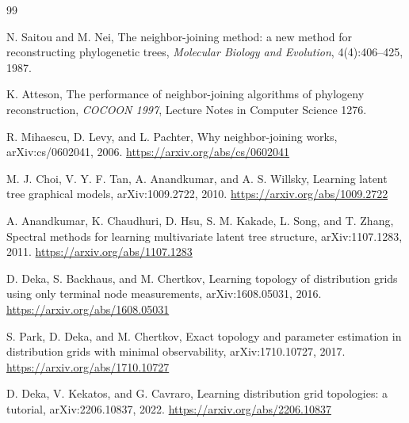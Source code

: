 \documentclass[UTF8,11pt]{ctexart}
\begin{document}
\begin{thebibliography}{99}

N. Saitou and M. Nei,
\newblock The neighbor-joining method: a new method for reconstructing phylogenetic trees,
\newblock \emph{Molecular Biology and Evolution}, 4(4):406--425, 1987.

K. Atteson,
\newblock The performance of neighbor-joining algorithms of phylogeny reconstruction,
\newblock \emph{COCOON 1997}, Lecture Notes in Computer Science 1276.

R. Mihaescu, D. Levy, and L. Pachter,
\newblock Why neighbor-joining works,
\newblock arXiv:cs/0602041, 2006.
\newblock \url{https://arxiv.org/abs/cs/0602041}

M. J. Choi, V. Y. F. Tan, A. Anandkumar, and A. S. Willsky,
\newblock Learning latent tree graphical models,
\newblock arXiv:1009.2722, 2010.
\newblock \url{https://arxiv.org/abs/1009.2722}

A. Anandkumar, K. Chaudhuri, D. Hsu, S. M. Kakade, L. Song, and T. Zhang,
\newblock Spectral methods for learning multivariate latent tree structure,
\newblock arXiv:1107.1283, 2011.
\newblock \url{https://arxiv.org/abs/1107.1283}

D. Deka, S. Backhaus, and M. Chertkov,
\newblock Learning topology of distribution grids using only terminal node measurements,
\newblock arXiv:1608.05031, 2016.
\newblock \url{https://arxiv.org/abs/1608.05031}

S. Park, D. Deka, and M. Chertkov,
\newblock Exact topology and parameter estimation in distribution grids with minimal observability,
\newblock arXiv:1710.10727, 2017.
\newblock \url{https://arxiv.org/abs/1710.10727}

D. Deka, V. Kekatos, and G. Cavraro,
\newblock Learning distribution grid topologies: a tutorial,
\newblock arXiv:2206.10837, 2022.
\newblock \url{https://arxiv.org/abs/2206.10837}

\end{thebibliography}
\end{document}
